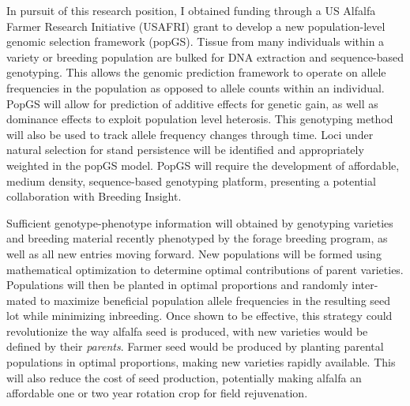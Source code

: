 \documentclass[11pt]{article}
\newcommand{\nicholas}[1]{{\color{nicholasCol} [\textbf{NS:} #1 (\today\ \currenttime)]}}
\begin{document}


In pursuit of this research position, I obtained funding through a US Alfalfa Farmer Research Initiative (USAFRI) grant to develop a new population-level genomic selection framework (popGS). Tissue from many individuals within a variety or breeding population are bulked for DNA extraction and sequence-based genotyping. This allows the genomic prediction framework to operate on allele frequencies in the population as opposed to allele counts within an individual. PopGS will allow for prediction of additive effects for genetic gain, as well as dominance effects to exploit population level heterosis. This genotyping method will also be used to track allele frequency changes through time. Loci under natural selection for stand persistence will be identified and appropriately weighted in the popGS model. PopGS will require the development of affordable, medium density, sequence-based genotyping platform, presenting a potential collaboration with Breeding Insight. 

Sufficient genotype-phenotype information will obtained by genotyping varieties and breeding material recently phenotyped by the forage breeding program, as well as all new entries moving forward. New populations will be formed using mathematical optimization to determine optimal contributions of parent varieties. Populations will then be planted in optimal proportions and randomly inter-mated to maximize beneficial population allele frequencies in the resulting seed lot while minimizing inbreeding. Once shown to be effective, this strategy could revolutionize the way alfalfa seed is produced, with new varieties would be defined by their \emph{parents}. Farmer seed would be produced by planting parental populations in optimal proportions, making new varieties rapidly available. This will also reduce the cost of seed production, potentially making alfalfa an affordable one or two year rotation crop for field rejuvenation.


\end{document}
